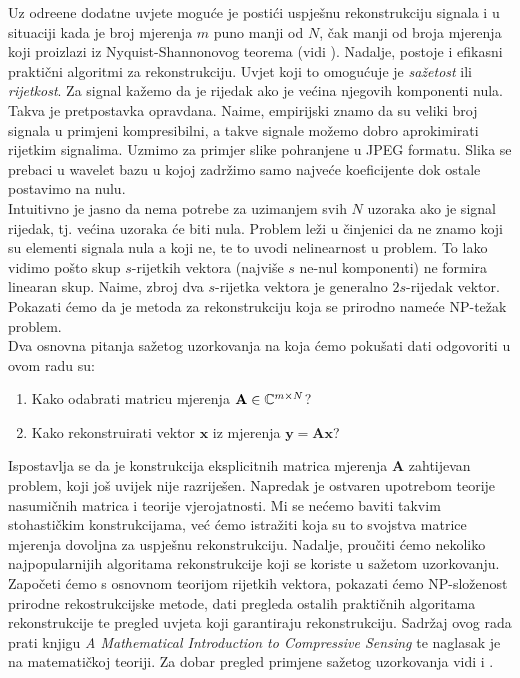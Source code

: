 \documentclass[a4paper,twoside,12pt]{memoir} %
\newcommand{\vect}[1]{\mathbf{#1}}
\renewcommand{\vec}{\vect}
\begin{document}
\begin{intro}
    Uz odre\dj ene dodatne uvjete mogu\'ce je posti\'ci uspje\v{s}nu rekonstrukciju signala i u situaciji kada je broj mjerenja $m$ puno manji od $N$, \v{c}ak manji od broja mjerenja koji proizlazi iz Nyquist-Shannonovog teorema (vidi \cite{radar}). Nadalje, postoje i efikasni prakti\v{c}ni algoritmi za rekonstrukciju. Uvjet koji to omogu\'{c}uje je \textit{sa\v{z}etost} ili \textit{rijetkost}. Za signal ka\v{z}emo da je rijedak ako je ve\'cina njegovih komponenti nula. Takva je pretpostavka opravdana. Naime, empirijski znamo da su veliki broj signala u primjeni kompresibilni, a takve signale mo\v{z}emo dobro aprokimirati rijetkim signalima. Uzmimo za primjer slike pohranjene u JPEG formatu. Slika se prebaci u wavelet bazu u kojoj zadr\v{z}imo samo najve\'ce koeficijente dok ostale postavimo na nulu.\\
    \indent
    Intuitivno je jasno da nema potrebe za uzimanjem svih $N$ uzoraka ako je signal rijedak, tj. ve\'cina uzoraka \'ce biti nula. Problem le\v{z}i u \v{c}injenici da ne znamo koji su elementi signala nula a koji ne, te to uvodi nelinearnost u problem. To lako vidimo po\v{s}to skup $s$-rijetkih vektora (najvi\v{s}e $s$ ne-nul komponenti) ne formira linearan skup. Naime, zbroj dva $s$-rijetka vektora je generalno $2s$-rijedak vektor. Pokazati \'cemo da je metoda za rekonstrukciju koja se prirodno name\'ce NP-te\v{z}ak problem. \\
    \indent
    Dva osnovna pitanja sa\v{z}etog uzorkovanja na koja \'cemo poku\v{s}ati dati odgovoriti u ovom radu su:
    \begin{enumerate}
        \item Kako odabrati matricu mjerenja $\vec A \in \C^{m \times N}$? 
        \item Kako rekonstruirati vektor $\vec x$ iz mjerenja $ \vec y = \vec{Ax}$?
    \end{enumerate}
    Ispostavlja se da je konstrukcija eksplicitnih matrica mjerenja $\vec A$ zahtijevan problem, koji jo\v{s} uvijek nije razrije\v{s}en. Napredak je ostvaren upotrebom teorije nasumi\v{c}nih matrica i teorije vjerojatnosti. Mi se ne\'cemo baviti takvim stohasti\v{c}kim konstrukcijama, ve\'c \'cemo istra\v{z}iti koja su to svojstva matrice mjerenja dovoljna za uspje\v{s}nu rekonstrukciju. Nadalje, prou\v{c}iti \'cemo nekoliko najpopularnijih algoritama rekonstrukcije koji se koriste u sa\v{z}etom uzorkovanju. Zapo\v{c}eti \'cemo s osnovnom teorijom rijetkih vektora, pokazati \'cemo NP-slo\v{z}enost prirodne rekostrukcijske metode, dati pregleda ostalih prakti\v{c}nih algoritama rekonstrukcije te pregled uvjeta koji garantiraju rekonstrukciju. Sadr\v{z}aj ovog rada prati knjigu \textit{A Mathematical Introduction to Compressive Sensing} \cite{foucart13} te naglasak je na matemati\v{c}koj teoriji. Za dobar pregled primjene sa\v{z}etog uzorkovanja vidi \cite{primjene} i \cite{tao}.

\end{intro}
\end{document}
